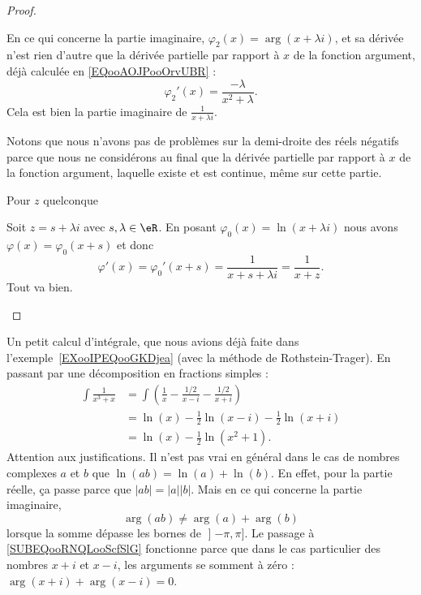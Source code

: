 \begin{proof}
\begin{subproof}
            En ce qui concerne la partie imaginaire, \( \varphi_2(x)=\arg(x+\lambda i)\), et sa dérivée n'est rien d'autre que la dérivée partielle par rapport à \( x\) de la fonction argument, déjà calculée en \eqref{EQooAOJPooOrvUBR} :
            \begin{equation}
                \varphi_2'(x)=\frac{ -\lambda }{ x^2+\lambda }.
            \end{equation}
            Cela est bien la partie imaginaire de \( \frac{1}{ x+\lambda i }\).

    Notons que nous n'avons pas de problèmes sur la demi-droite des réels négatifs parce que nous ne considérons au final que la dérivée partielle par rapport à \( x\) de la fonction argument, laquelle existe et est continue, même sur cette partie.

        \item[Pour \( z\) quelconque]

            Soit \( z=s+\lambda i\) avec \( s,\lambda\in \eR\). En posant \( \varphi_0(x)=\ln(x+\lambda i)\) nous avons \( \varphi(x)=\varphi_0(x+s)\) et donc
            \begin{equation}
                \varphi'(x)=\varphi_0'(x+s)=\frac{ 1 }{ x+s+\lambda i }=\frac{1}{ x+z }.
            \end{equation}
            Tout va bien.

    \end{subproof}
\end{proof}

\begin{example}     \label{EXooAKEDooZgjocX}
    Un petit calcul d'intégrale, que nous avions déjà faite dans l'exemple~\ref{EXooIPEQooGKDjea} (avec la méthode de Rothstein-Trager). En passant par une décomposition en fractions simples :
    \begin{subequations}
        \begin{align}
            \int\frac{1}{ x^3+x }&=\int\left( \frac{1}{ x }-\frac{ 1/2 }{ x-i }-\frac{ 1/2 }{ x+i } \right)\\
            &=\ln(x)-\frac{ 1 }{2}\ln(x-i)-\frac{ 1 }{2}\ln(x+i)\\
            &=\ln(x)-\frac{ 1 }{2}\ln(x^2+1).       \label{SUBEQooRNQLooScfSlG}
        \end{align}
    \end{subequations}
    Attention aux justifications. Il n'est pas vrai en général dans le cas de nombres complexes \( a\) et \( b\) que \( \ln(ab)=\ln(a)+\ln(b)\). En effet, pour la partie réelle, ça passe parce que \( | ab |=| a | |b |\). Mais en ce qui concerne la partie imaginaire,
    \begin{equation}
        \arg(ab)\neq \arg(a)+\arg(b)
    \end{equation}
lorsque la somme dépasse les bornes de \( \mathopen] -\pi , \pi \mathclose]\). Le passage à \eqref{SUBEQooRNQLooScfSlG} fonctionne parce que dans le cas particulier des nombres \( x+i\) et \( x-i\), les arguments se somment à zéro : \( \arg(x+i)+\arg(x-i)=0\).
\end{example}

